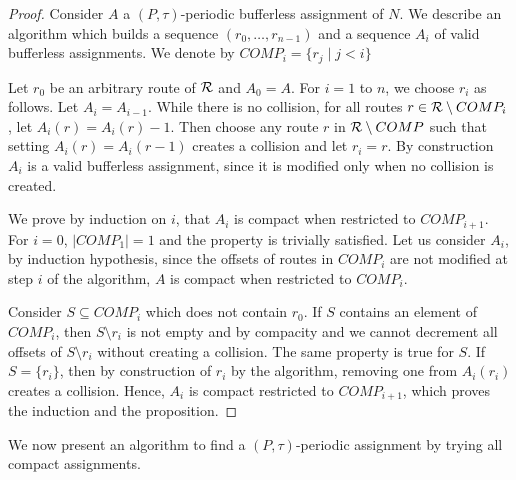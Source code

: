 \begin{proof}
Consider $A$ a $(P,\tau)$-periodic bufferless assignment of $N$.
We describe an algorithm which builds a sequence $(r_0,\dots,r_{n-1})$ and a sequence  
$A_i$ of valid bufferless assignments. We denote by $COMP_i = \{ r_j \mid j < i\}$

Let $r_0$ be an arbitrary route of ${\cal R}$ and $A_0 = A$. For $i = 1$ to $n$, we choose $r_i$ as follows.
Let $A_{i} = A_{i-1}$. While there is no collision, for all routes $r \in {\cal R} \setminus COMP_i$, let $A_i(r) = A_i(r) - 1$. Then choose any route $r$ in ${\cal R} \setminus COMP$ such that setting $A_i(r) = A_i(r-1)$ creates a collision and let $r_i = r$. By construction $A_i$ is a valid bufferless assignment, since it is modified only when no collision is created.

We prove by induction on $i$, that $A_i$ is compact when restricted to $COMP_{i+1}$.
For $i = 0$, $|COMP_1| = 1$ and the property is trivially satisfied. Let us consider $A_i$,
by induction hypothesis, since the offsets of routes in $COMP_{i}$ are not modified at step $i$ of the algorithm, $A$ is compact when restricted to $COMP_{i}$. 

 Consider $S \subseteq COMP_i$ which does not contain $r_0$. If $S$ contains
an element of $COMP_{i}$, then $S \setminus {r_i}$ is not empty and by compacity and we cannot decrement all offsets of $S\setminus {r_i}$ without creating a collision. The same property is true for $S$. If $S = \{r_i\}$, then by construction of $r_i$ by the algorithm, removing one from $A_i(r_i)$ creates a collision. Hence,
$A_i$ is compact restricted to $COMP_{i+1}$, which proves the induction and the proposition.
\end{proof}

We now present an algorithm to find a $(P,\tau)$-periodic assignment by trying all compact assignments.

